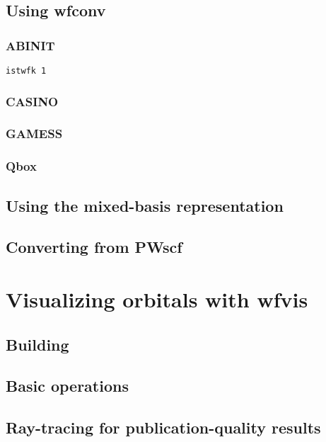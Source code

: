 \subsection{Using wfconv}
\subsubsection{ABINIT}
\tt{istwfk 1}
\subsubsection{CASINO}
\subsubsection{GAMESS}
\subsubsection{Qbox}
\subsection{Using the mixed-basis representation}

\subsection{Converting from PWscf}


\section{Visualizing orbitals with wfvis}
\subsection{Building}
\subsection{Basic operations}
\subsection{Ray-tracing for publication-quality results}
